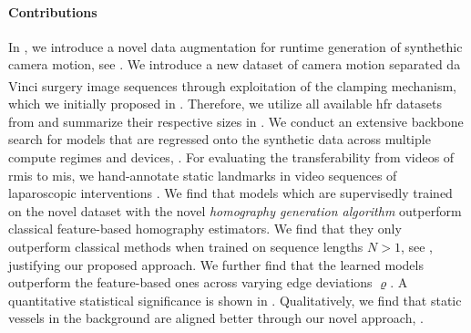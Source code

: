 \paragraph{Contributions} In , we introduce a novel data augmentation  for runtime generation of synthethic camera motion, see . We introduce a new dataset of camera motion separated da Vinci\textsuperscript{\textregistered} surgery image sequences through exploitation of the clamping mechanism, which we initially proposed in . Therefore, we utilize all available \gls{hfr} datasets from  and summarize their respective sizes in . We conduct an extensive backbone search for models that are regressed onto the synthetic data across multiple compute regimes and devices, . For evaluating the transferability from videos of \gls{rmis} to \gls{mis}, we hand-annotate static landmarks in video sequences of laparoscopic interventions . We find that models which are supervisedly trained on the novel dataset with the novel \textit{homography generation algorithm} outperform classical feature-based homography estimators. We find that they only outperform classical methods when trained on sequence lengths $N>1$, see , justifying our proposed approach. We further find that the learned models outperform the feature-based ones across varying edge deviations $\varrho$. A quantitative statistical significance is shown in . Qualitatively, we find that static vessels in the background are aligned better through our novel approach, .

